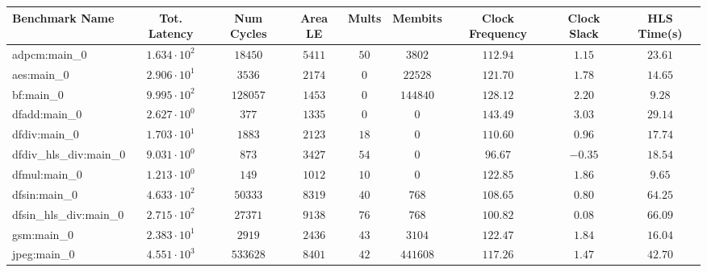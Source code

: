 \begin{tabular}{|l|c|c|c|c|c|c|c|c|}
\hline
Benchmark Name          & Tot. Latency           & Num Cycles & Area LE   & Mults   & Membits    & Clock Frequency & Clock Slack & HLS Time(s) \\
\hline
adpcm:main\_0           & $ 1.634 \cdot 10^{2} $ & $ 18450  $ & $ 5411  $ & $ 50  $ & $ 3802   $ & $ 112.94      $ & $ 1.15    $ & $ 23.61   $ \\
aes:main\_0             & $ 2.906 \cdot 10^{1} $ & $ 3536   $ & $ 2174  $ & $ 0   $ & $ 22528  $ & $ 121.70      $ & $ 1.78    $ & $ 14.65   $ \\
bf:main\_0              & $ 9.995 \cdot 10^{2} $ & $ 128057 $ & $ 1453  $ & $ 0   $ & $ 144840 $ & $ 128.12      $ & $ 2.20    $ & $ 9.28    $ \\
dfadd:main\_0           & $ 2.627 \cdot 10^{0} $ & $ 377    $ & $ 1335  $ & $ 0   $ & $ 0      $ & $ 143.49      $ & $ 3.03    $ & $ 29.14   $ \\
dfdiv:main\_0           & $ 1.703 \cdot 10^{1} $ & $ 1883   $ & $ 2123  $ & $ 18  $ & $ 0      $ & $ 110.60      $ & $ 0.96    $ & $ 17.74   $ \\
dfdiv\_hls\_div:main\_0 & $ 9.031 \cdot 10^{0} $ & $ 873    $ & $ 3427  $ & $ 54  $ & $ 0      $ & $ 96.67       $ & $ -0.35   $ & $ 18.54   $ \\
dfmul:main\_0           & $ 1.213 \cdot 10^{0} $ & $ 149    $ & $ 1012  $ & $ 10  $ & $ 0      $ & $ 122.85      $ & $ 1.86    $ & $ 9.65    $ \\
dfsin:main\_0           & $ 4.633 \cdot 10^{2} $ & $ 50333  $ & $ 8319  $ & $ 40  $ & $ 768    $ & $ 108.65      $ & $ 0.80    $ & $ 64.25   $ \\
dfsin\_hls\_div:main\_0 & $ 2.715 \cdot 10^{2} $ & $ 27371  $ & $ 9138  $ & $ 76  $ & $ 768    $ & $ 100.82      $ & $ 0.08    $ & $ 66.09   $ \\
gsm:main\_0             & $ 2.383 \cdot 10^{1} $ & $ 2919   $ & $ 2436  $ & $ 43  $ & $ 3104   $ & $ 122.47      $ & $ 1.84    $ & $ 16.04   $ \\
jpeg:main\_0            & $ 4.551 \cdot 10^{3} $ & $ 533628 $ & $ 8401  $ & $ 42  $ & $ 441608 $ & $ 117.26      $ & $ 1.47    $ & $ 42.70   $ \\

\end{tabular}
